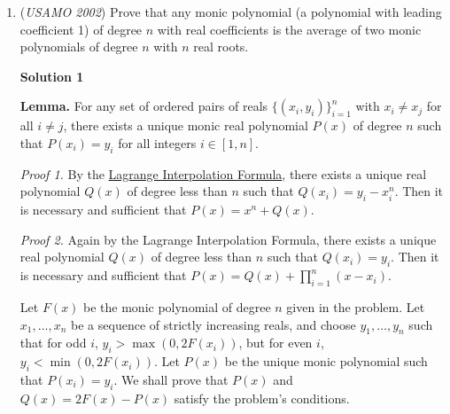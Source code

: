 \begin{enumerate}
 from which we easily obtain $(x,y,z)=(\frac{36}{49} , \frac{9}{49} , \frac{4}{49} )$. We calculate that this indeed satisfy $x^2 + 4 y^2 + 9 z^2 = (\frac{6}{7})^2$, so $(\frac{6}{7})^2$ is indeed an relative extrema. To check that it is a global extrema, one notes that as x, y, or z goes towards plus or minus infinity, the function $x^2 + 4 y^2 + 9 z^2$ goes to positive infinity, so that $(\frac{6}{7})^2$ is the global minima. Now, $AB=x+y=\frac{45}{49}$, $AC=x+z=\frac{40}{49}$, and $BC=y+z=\frac{13}{49}$, so we see that the desired side lengths are $AB=45, AC=40, BC=13$. $\square$. 

 
<i>Alternate solutions are always welcome. If you have a different, elegant solution to this problem, please \href{https://artofproblemsolving.com/wiki/index.php?title=2002\_USAMO\_Problems/Problem\_2&action=edit}{add it} to this page.</i>



	\item (\textit{USAMO 2002}) Prove that any monic polynomial (a polynomial with leading coefficient 1) of degree $n$ with real coefficients is the average of two monic polynomials of degree $n$ with $n$ real roots.


 



\textbf{Solution 1}

\textbf{Lemma.}  For any set of ordered pairs of reals $\{ (x_i , y_i ) \}_{i=1}^{n}$ with $x_i \neq x_j$ for all $i \neq j$, there exists a unique monic real polynomial  $P(x)$ of degree $n$ such that $P(x_i) = y_i$ for all integers $i \in [1,n]$.

 \textit{Proof 1.}  By the \href{https://artofproblemsolving.com/wiki/index.php?title=Lagrange\_Interpolation\_Formula}{Lagrange Interpolation Formula}, there exists a unique real polynomial $Q(x)$ of degree less than $n$ such that $Q(x_i) = y_i - x_i^n$.  Then it is necessary and sufficient that $P(x) = x^n + Q(x)$.

 \textit{Proof 2.}  Again by the Lagrange Interpolation Formula, there exists a unique real polynomial $Q(x)$ of degree less than $n$ such that $Q(x_i) = y_i$.  Then it is necessary and sufficient that $P(x) = Q(x) + \prod_{i=1}^{n}(x-x_i)$.

 Let $F(x)$ be the monic polynomial of degree $n$ given in the problem.  Let $x_1, \ldots, x_n$ be a sequence of strictly increasing reals, and choose $y_1, \ldots, y_n$ such that for odd $i$, $y_i > \max (0, 2F(x_i))$, but for even $i$, $y_i < \min (0, 2F(x_i))$.  Let $P(x)$ be the unique monic polynomial such that $P(x_i) = y_i$.  We shall prove that $P(x)$ and $Q(x) = 2F(x) - P(x)$ satisfy the problem's conditions.


\end{enumerate}

